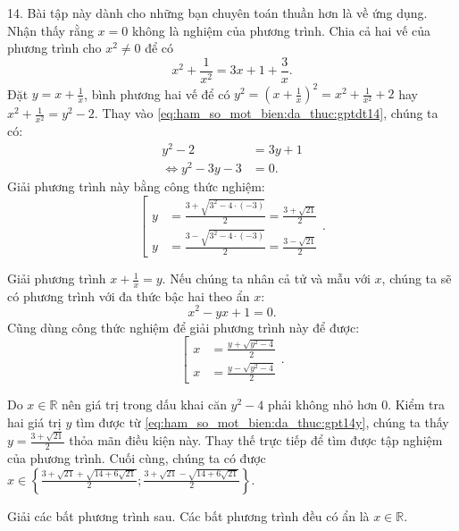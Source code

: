 14. Bài tập này dành cho những bạn chuyên toán thuần hơn là về ứng dụng. Nhận thấy rằng $x = 0$ không là nghiệm của phương trình. Chia cả hai vế của phương trình cho $x^2 \neq 0$ để có 
\begin{equation}
   x^2 + \frac{1}{x^2} = 3x + 1 + \frac{3}{x}. 
   \label{eq:ham_so_mot_bien:da_thuc:gptdt14}
\end{equation}
Đặt $y = x + \frac{1}{x}$, bình phương hai vế để có $y^2 = \left(x + \frac{1}{x}\right)^2 = x^2 + \frac{1}{x^2} + 2$ hay $x^2 + \frac{1}{x^2} = y^2 - 2$. Thay vào \ref{eq:ham_so_mot_bien:da_thuc:gptdt14}, chúng ta có:
\begin{align*}
   y^2 - 2 &= 3y + 1 \\
   \iff y^2 - 3y - 3 &= 0.
\end{align*}
Giải phương trình này bằng công thức nghiệm:
\begin{equation}   
   \left[
      \begin{aligned}
         y &= \frac{3 + \sqrt{3^2 - 4 \cdot (-3)}}{2} = \frac{3 + \sqrt{21}}{2} \\
         y &= \frac{3 - \sqrt{3^2 - 4 \cdot (-3)}}{2} = \frac{3 - \sqrt{21}}{2}
      \end{aligned}
   \right..\label{eq:ham_so_mot_bien:da_thuc:gpt14y}
\end{equation}

Giải phương trình $x + \frac{1}{x} = y$. Nếu chúng ta nhân cả tử và mẫu với $x$, chúng ta sẽ có phương trình với đa thức bậc hai theo ẩn $x$: $$x^2 - yx + 1 = 0.$$ Cũng dùng công thức nghiệm để giải phương trình này để được:
$$
\left[
   \begin{aligned}
      x &= \frac{y + \sqrt{y^2 - 4}}{2} \\
      x &= \frac{y - \sqrt{y^2 - 4}}{2}
   \end{aligned}
\right..
$$

Do $x \in \mathbb{R}$ nên giá trị trong dấu khai căn $y^2 - 4$ phải không nhỏ hơn $0$. Kiểm tra hai giá trị $y$ tìm được từ \ref{eq:ham_so_mot_bien:da_thuc:gpt14y}, chúng ta thấy $y = \frac{3 + \sqrt{21}}{2}$ thỏa mãn điều kiện này. Thay thế trực tiếp để tìm được tập nghiệm của phương trình. Cuối cùng, chúng ta có được $x \in \displaystyle\left\{\frac{3+\sqrt{21}+\sqrt{14 + 6\sqrt{21}}}{2}; \frac{3+\sqrt{21}-\sqrt{14 + 6\sqrt{21}}}{2}\right\}$.

\exercise Giải các bất phương trình sau. Các bất phương trình đều có ẩn là $x \in \mathbb{R}$.

